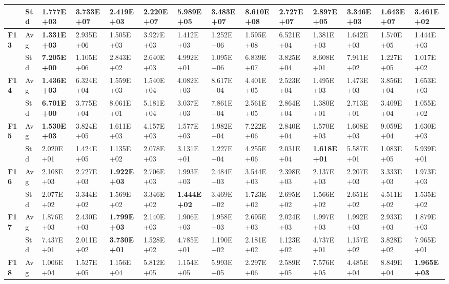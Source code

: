 \documentclass{article} %
\begin{document}
\begin{tabular}{|p{0.2in}|p{0.2in}|p{0.4in}|p{0.4in}|p{0.4in}|p{0.4in}|p{0.4in}|p{0.4in}|p{0.4in}|p{0.4in}|p{0.4in}|p{0.4in}|p{0.4in}|p{0.4in}|}
\textbf{} & Std & 1.777E+03 & 3.733E+07 & 2.419E+03 & 2.220E+07 & 5.989E+05 & 3.483E+07 & 8.610E+08 & 2.727E+07 & 2.897E+05 & 3.346E+03 & 1.643E+07 & \textbf{3.461E+02} \\ \hline 
\textbf{F13} & Avg & \textbf{1.331E+03} & 2.935E+06 & 1.505E+03 & 3.927E+03 & 1.412E+03 & 1.252E+06 & 1.595E+08 & 6.521E+04 & 1.381E+03 & 1.642E+03 & 1.570E+05 & 1.444E+03 \\ \hline 
\textbf{} & Std & \textbf{7.205E+00} & 1.105E+06 & 2.843E+02 & 2.640E+03 & 4.992E+01 & 1.095E+06 & 6.839E+07 & 3.825E+04 & 8.608E+01 & 7.911E+02 & 1.227E+05 & 1.017E+02 \\ \hline 
\textbf{F14} & Avg & \textbf{1.436E+03} & 6.324E+04 & 1.559E+03 & 1.540E+04 & 4.082E+03 & 8.617E+04 & 4.401E+05 & 2.523E+04 & 1.495E+03 & 1.473E+03 & 3.856E+04 & 1.653E+03 \\ \hline 
\textbf{} & Std & \textbf{6.701E+00} & 3.775E+04 & 8.061E+01 & 5.181E+04 & 3.037E+03 & 7.861E+04 & 2.561E+05 & 2.864E+04 & 1.380E+01 & 2.713E+01 & 3.409E+04 & 1.055E+02 \\ \hline 
\textbf{F15} & Avg & \textbf{1.530E+03} & 3.824E+05 & 1.611E+03 & 4.157E+03 & 1.577E+03 & 1.982E+04 & 7.222E+06 & 2.840E+04 & 1.570E+03 & 1.608E+03 & 9.059E+04 & 1.630E+03 \\ \hline 
\textbf{} & Std & 2.020E+01 & 1.424E+05 & 1.135E+02 & 2.078E+03 & 3.131E+01 & 1.227E+04 & 4.255E+06 & 2.031E+04 & \textbf{1.618E+01} & 5.587E+01 & 1.083E+05 & 5.939E+01 \\ \hline 
\textbf{F16} & Avg & 2.108E+03 & 2.727E+03 & \textbf{1.922E+03} & 2.706E+03 & 1.993E+03 & 2.484E+03 & 3.544E+03 & 2.398E+03 & 2.137E+03 & 2.207E+03 & 3.333E+03 & 1.973E+03 \\ \hline 
\textbf{} & Std & 2.077E+02 & 3.344E+02 & 1.569E+02 & 3.346E+02 & \textbf{1.444E+02} & 3.469E+02 & 1.723E+02 & 2.695E+02 & 1.566E+02 & 2.651E+02 & 4.511E+02 & 1.535E+02 \\ \hline 
\textbf{F17} & Avg & 1.876E+03 & 2.430E+03 & \textbf{1.799E+03} & 2.140E+03 & 1.906E+03 & 1.958E+03 & 2.695E+03 & 2.024E+03 & 1.997E+03 & 1.992E+03 & 2.933E+03 & 1.879E+03 \\ \hline 
\textbf{} & Std & 7.437E+01 & 2.011E+02 & \textbf{3.730E+01} & 1.528E+02 & 4.785E+01 & 1.190E+02 & 2.181E+02 & 1.123E+02 & 4.737E+01 & 1.157E+02 & 3.828E+02 & 7.965E+01 \\ \hline 
\textbf{F18} & Avg & 1.006E+04 & 1.527E+05 & 1.156E+04 & 5.812E+05 & 1.154E+05 & 5.993E+05 & 2.297E+06 & 2.589E+05 & 7.576E+05 & 4.485E+04 & 8.849E+04 & \textbf{1.965E+03} \\ \hline 

\end{tabular}
\end{document}
